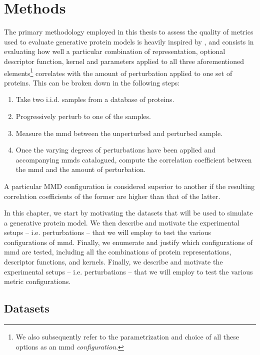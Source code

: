 \chapter{Methods}\label{chap:methods}

The primary methodology employed in this thesis to assess the quality of metrics
used to evaluate generative protein models is heavily inspired by
\cite{obray2022evaluation}, and consists in evaluating how well a particular
combination of representation, optional descriptor function, kernel and
parameters applied to all three aforementioned elements\footnote{We also
subsequently refer to the parametrization and choice of all these options as an
\acrshort{mmd} \emph{configuration}.} correlates with the amount of
perturbation %
applied to one set of proteins. This can be broken down in the following steps:

\begin{enumerate}
\item Take two i.i.d. samples from a database of proteins.
\item Progressively perturb to one of the samples.
\item Measure the \acrshort{mmd} between the unperturbed and perturbed sample.
\item Once the varying degrees of perturbations have been applied and
accompanying \acrshort{mmd}s catalogued, compute the correlation coefficient
between the \acrshort{mmd} and the amount of perturbation.
\end{enumerate}

A particular MMD configuration is considered superior to another if the
resulting correlation coefficients of the former are higher than that of the latter.

In this chapter, we start by motivating the datasets that will be used to simulate a generative
protein model. We then describe and motivate the experimental setups -- i.e.
perturbations -- that we will employ to test the various configurations of \acrshort{mmd}.
Finally, we enumerate and justify which configurations of \acrshort{mmd} are tested,
including all the combinations of protein representations, descriptor functions,
and kernels. Finally, we describe and motivate the experimental setups -- i.e.
perturbations -- that we will employ to test the various metric configurations.

\section{Datasets}

